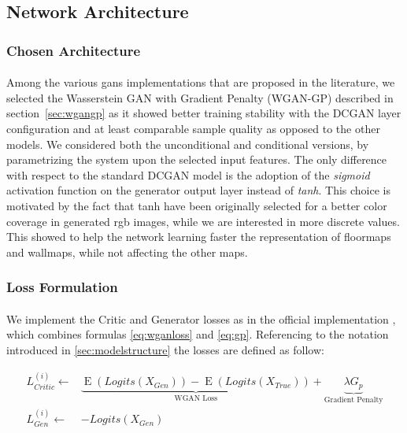 \subsection{Network Architecture}
\label{sec:networkarch}

\subsubsection{Chosen Architecture} 
\paragraph{} Among the various \glspl{gan} implementations that are proposed in the literature, we selected the Wasserstein GAN with Gradient Penalty \cite{wgangp} (WGAN-GP) described in section~\ref{sec:wgangp} as it showed better training stability with the DCGAN layer configuration and at least comparable sample quality as opposed to the other models. We considered both the unconditional and conditional versions, by parametrizing the system upon the selected input features. The only difference with respect to the standard DCGAN model is the adoption of the \textit{sigmoid} activation function on the generator output layer instead of \textit{tanh}. This choice is motivated by the fact that tanh have been originally selected for a better color coverage in generated rgb images, while we are interested in more discrete values. This showed to help the network learning faster the representation of \glspl{floormap} and \glspl{wallmap}, while not affecting the other maps.


\subsubsection{Loss Formulation}
\paragraph{} We implement the Critic and Generator losses as in the  official implementation \cite{wgangp-imple}, which combines formulas \ref{eq:wganloss} and \ref{eq:gp}. Referencing to the notation introduced in \ref{sec:modelstructure} the losses are defined as follow:

\begin{equation}
\label{eq:loss}
\begin{split}
L_{Critic}^{(i)} \gets & \underbrace{\operatorname{E}(Logits(X_{Gen})) - \operatorname{E}(Logits(X_{True}))}_{\text{WGAN Loss}} + \underbrace {\lambda G_p}_{\text{Gradient Penalty}} \\
L_{Gen}^{(i)} \gets & -Logits(X_{Gen}) 
\end{split}
\end{equation}

